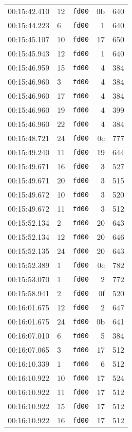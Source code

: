 \documentclass{article}
\begin{document}
\begin{longtable}{lllrr}
00:15:42.410 & 12 & \texttt{fd00} & 0b & 640 \\
00:15:44.223 & 6 & \texttt{fd00} & 1 & 640 \\
00:15:45.107 & 10 & \texttt{fd00} & 17 & 650 \\
00:15:45.943 & 12 & \texttt{fd00} & 1 & 640 \\
00:15:46.959 & 15 & \texttt{fd00} & 4 & 384 \\
00:15:46.960 & 3 & \texttt{fd00} & 4 & 384 \\
00:15:46.960 & 17 & \texttt{fd00} & 4 & 384 \\
00:15:46.960 & 19 & \texttt{fd00} & 4 & 399 \\
00:15:46.960 & 22 & \texttt{fd00} & 4 & 384 \\
00:15:48.721 & 24 & \texttt{fd00} & 0c & 777 \\
00:15:49.240 & 11 & \texttt{fd00} & 19 & 644 \\
00:15:49.671 & 16 & \texttt{fd00} & 3 & 527 \\
00:15:49.671 & 20 & \texttt{fd00} & 3 & 515 \\
00:15:49.672 & 10 & \texttt{fd00} & 3 & 520 \\
00:15:49.672 & 11 & \texttt{fd00} & 3 & 512 \\
00:15:52.134 & 2 & \texttt{fd00} & 20 & 643 \\
00:15:52.134 & 12 & \texttt{fd00} & 20 & 646 \\
00:15:52.135 & 24 & \texttt{fd00} & 20 & 643 \\
00:15:52.389 & 1 & \texttt{fd00} & 0c & 782 \\
00:15:53.070 & 1 & \texttt{fd00} & 2 & 772 \\
00:15:58.941 & 2 & \texttt{fd00} & 0f & 520 \\
00:16:01.675 & 12 & \texttt{fd00} & 2 & 647 \\
00:16:01.675 & 24 & \texttt{fd00} & 0b & 641 \\
00:16:07.010 & 6 & \texttt{fd00} & 5 & 384 \\
00:16:07.065 & 3 & \texttt{fd00} & 17 & 512 \\
00:16:10.339 & 1 & \texttt{fd00} & 6 & 512 \\
00:16:10.922 & 10 & \texttt{fd00} & 17 & 524 \\
00:16:10.922 & 11 & \texttt{fd00} & 17 & 512 \\
00:16:10.922 & 15 & \texttt{fd00} & 17 & 512 \\
00:16:10.922 & 16 & \texttt{fd00} & 17 & 512 \\

\end{longtable}
\end{document}
